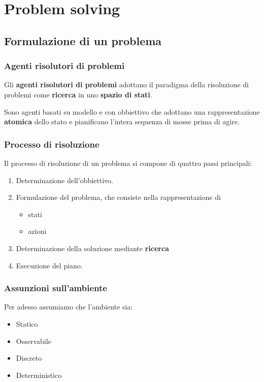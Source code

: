 \chapter{Problem solving}
\section{Formulazione di un problema}
\subsection{Agenti risolutori di problemi}
Gli \textbf{agenti risolutori di problemi} adottano il paradigma della risoluzione di problemi
come \textbf{ricerca} in uno \textbf{spazio di stati}.

Sono agenti basati su modello e con obbiettivo che adottano una rappresentazione
\textbf{atomica} dello stato e pianificano l'intera sequenza di mosse prima di agire.

\subsection{Processo di risoluzione}
Il processo di risoluzione di un problema si compone di quattro passi principali:
\begin{enumerate}
	\item Determinazione dell'obbiettivo.
	\item Formulazione del problema, che consiste nella rappresentazione di
	      \begin{itemize}
		      \item stati
		      \item azioni
	      \end{itemize}
	\item Determinazione della soluzione mediante \textbf{ricerca}
	\item Esecuzione del piano.
\end{enumerate}

\subsection{Assunzioni sull'ambiente}
Per adesso assumiamo che l'ambiente sia:
\begin{itemize}
	\item Statico
	\item Osservabile
	\item Discreto
	\item Deterministico
\end{itemize}

